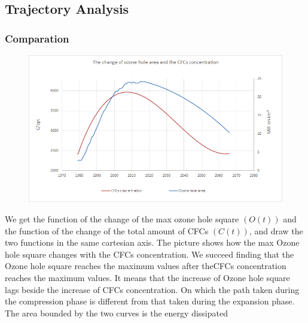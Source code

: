 \documentclass[12pt]{article}
\begin{document}
\subsection{Trajectory Analysis}
\subsubsection{Comparation}

\begin{center}
\begin{figure}[htpb]
\centering
\includegraphics[scale=0.4]{ha}
\caption{}\label{fig:twoline}
\end{figure}
\end{center}
We get the function of the change of the max ozone hole square $(O(t))$ and the function of the change of the total amount of CFCs $(C(t))$, and draw the two functions in the same cartesian axis. The picture shows how the max Ozone hole square changes with the CFCs concentration. We succeed finding that the Ozone hole square reaches the maximum values after theCFCs concentration reaches the maximum values. It means that the increase of Ozone hole square lags beside the increase of CFCs concentration.
On which the path taken during the compression phase
is different from that taken during the expansion phase. The area bounded by the two curves is the energy dissipated
\end{document}
